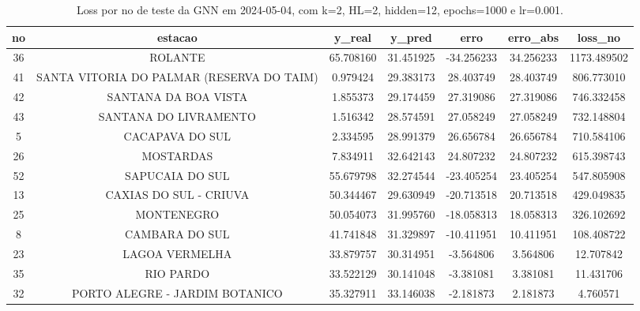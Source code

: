 \begin{table}[h]
\centering
\caption{Loss por no de teste da GNN em 2024-05-04, com k=2, HL=2, hidden=12, epochs=1000 e lr=0.001.}
\label{tab:gnn_loss_k2_hl2_h12_e1000_d20240504}
\begin{tabular}{ccccccc}
\toprule
no & estacao & y\_real & y\_pred & erro & erro\_abs & loss\_no \\
\midrule
36 & ROLANTE & 65.708160 & 31.451925 & -34.256233 & 34.256233 & 1173.489502 \\
41 & SANTA VITORIA DO PALMAR (RESERVA DO TAIM) & 0.979424 & 29.383173 & 28.403749 & 28.403749 & 806.773010 \\
42 & SANTANA DA BOA VISTA & 1.855373 & 29.174459 & 27.319086 & 27.319086 & 746.332458 \\
43 & SANTANA DO LIVRAMENTO & 1.516342 & 28.574591 & 27.058249 & 27.058249 & 732.148804 \\
5 & CACAPAVA DO SUL & 2.334595 & 28.991379 & 26.656784 & 26.656784 & 710.584106 \\
26 & MOSTARDAS & 7.834911 & 32.642143 & 24.807232 & 24.807232 & 615.398743 \\
52 & SAPUCAIA DO SUL & 55.679798 & 32.274544 & -23.405254 & 23.405254 & 547.805908 \\
13 & CAXIAS DO SUL - CRIUVA & 50.344467 & 29.630949 & -20.713518 & 20.713518 & 429.049835 \\
25 & MONTENEGRO & 50.054073 & 31.995760 & -18.058313 & 18.058313 & 326.102692 \\
8 & CAMBARA DO SUL & 41.741848 & 31.329897 & -10.411951 & 10.411951 & 108.408722 \\
23 & LAGOA VERMELHA & 33.879757 & 30.314951 & -3.564806 & 3.564806 & 12.707842 \\
35 & RIO PARDO & 33.522129 & 30.141048 & -3.381081 & 3.381081 & 11.431706 \\
32 & PORTO ALEGRE - JARDIM BOTANICO & 35.327911 & 33.146038 & -2.181873 & 2.181873 & 4.760571 \\
\bottomrule
\end{tabular}
\end{table}
